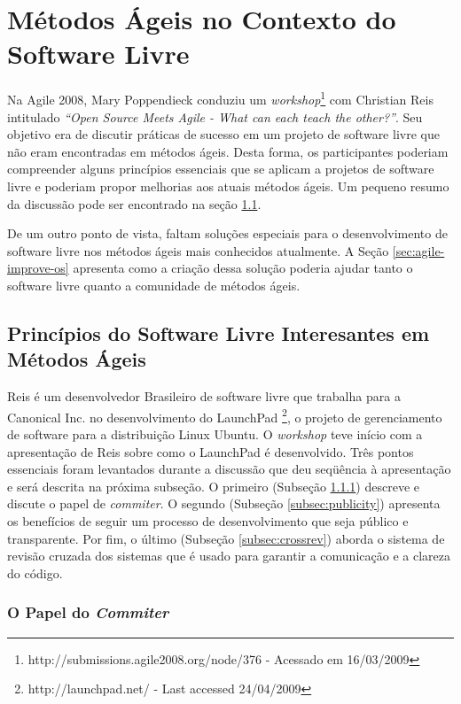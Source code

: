 \chapter{Métodos Ágeis no Contexto do Software Livre}
\label{cap:agile}

Na Agile 2008, Mary Poppendieck conduziu um
\emph{workshop}\footnote{http://submissions.agile2008.org/node/376 -
  Acessado em 16/03/2009} com Christian Reis intitulado \emph{``Open
  Source Meets Agile - What can each teach the other?''}. Seu objetivo
era de discutir práticas de sucesso em um projeto de software livre
que não eram encontradas em métodos ágeis. Desta forma, os
participantes poderiam compreender alguns princípios essenciais que se
aplicam a projetos de software livre e poderiam propor melhorias aos
atuais métodos ágeis. Um pequeno resumo da discussão pode ser
encontrado na seção \ref{sec:foss-over-agile}.

De um outro ponto de vista, faltam soluções especiais para o
desenvolvimento de software livre nos métodos ágeis mais conhecidos
atualmente. A Seção \ref{sec:agile-improve-os} apresenta como a
criação dessa solução poderia ajudar tanto o software livre quanto a
comunidade de métodos ágeis.

\section{Princípios do Software Livre Interesantes em Métodos Ágeis}
\label{sec:foss-over-agile}

Reis é um desenvolvedor Brasileiro de software livre que trabalha para
a Canonical Inc. no desenvolvimento do LaunchPad
\footnote{http://launchpad.net/ - Last accessed 24/04/2009}, o projeto
de gerenciamento de software para a distribuição Linux Ubuntu. O
\emph{workshop} teve início com a apresentação de Reis sobre como o
LaunchPad é desenvolvido. Três pontos essenciais foram levantados
durante a discussão que deu seqüência à apresentação e será descrita
na próxima subseção. O primeiro (Subseção \ref{subsec:commiter})
descreve e discute o papel de \emph{commiter}.  O segundo (Subseção
\ref{subsec:publicity}) apresenta os benefícios de seguir um processo
de desenvolvimento que seja público e transparente.  Por fim, o último
(Subseção \ref{subsec:crossrev}) aborda o sistema de revisão cruzada
dos sistemas que é usado para garantir a comunicação e a clareza do
código.

\subsection{O Papel do \emph{Commiter}}
\label{subsec:commiter}

